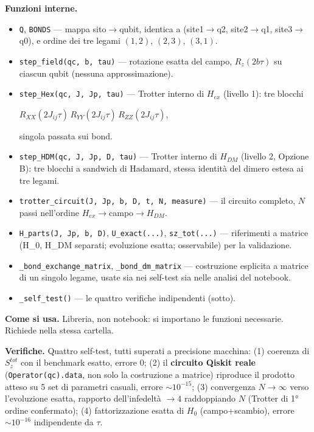 \documentclass[11pt,a4paper]{article}
\begin{document}
\textbf{Funzioni interne.}
\begin{itemize}
\item \texttt{Q}, \texttt{BONDS} — mappa sito$\to$qubit, identica a
\texttt{} (site1$\to$q2, site2$\to$q1,
site3$\to$q0), e ordine dei tre legami $(1,2)$, $(2,3)$, $(3,1)$.
\item \texttt{step\_field(qc,\ b,\ tau)} — rotazione esatta del campo, $R_z(2b\tau)$
su ciascun qubit (nessuna approssimazione).
\item \texttt{step\_Hex(qc,\ J,\ Jp,\ tau)} — Trotter interno di $H_{ex}$ (livello 1):
tre blocchi
\begin{center}
$R_{XX}(2J_{ij}\tau)\,R_{YY}(2J_{ij}\tau)\,R_{ZZ}(2J_{ij}\tau)$,
\end{center}
singola passata sui bond.
\item \texttt{step\_HDM(qc,\ J,\ Jp,\ D,\ tau)} — Trotter interno di $H_{DM}$
(livello 2, Opzione B): tre blocchi a sandwich di Hadamard, stessa identità del
dimero estesa ai tre legami.
\item \texttt{trotter\_circuit(J,\ Jp,\ b,\ D,\ t,\ N,\ measure)} — il circuito
completo, $N$ passi nell'ordine $H_{ex}\to$campo$\to H_{DM}$.
\item \texttt{H\_parts(J,\ Jp,\ b,\ D)}, \texttt{U\_exact(...)}, \texttt{sz\_tot(...)}
— riferimenti a matrice (H\_0, H\_DM separati; evoluzione esatta; osservabile) per la
validazione.
\item \texttt{\_bond\_exchange\_matrix}, \texttt{\_bond\_dm\_matrix} — costruzione
esplicita a matrice di un singolo legame, usate sia nei self-test sia nelle analisi
del notebook.
\item \texttt{\_self\_test()} — le quattro verifiche indipendenti (sotto).
\end{itemize}

\textbf{Come si usa.} Libreria, non notebook: si importano le funzioni necessarie.
Richiede \texttt{} nella stessa cartella.

\textbf{Verifiche.} Quattro self-test, tutti superati a precisione macchina:
(1) coerenza di $S_z^{tot}$ con il benchmark esatto, errore $0$; (2) il
\textbf{circuito Qiskit reale} (\texttt{Operator(qc).data}, non solo la costruzione a
matrice) riproduce il prodotto atteso su 5 set di parametri casuali, errore
$\sim10^{-15}$; (3) convergenza $N\to\infty$ verso l'evoluzione esatta, rapporto
dell'infedeltà $\to4$ raddoppiando $N$ (Trotter di 1° ordine confermato); (4)
fattorizzazione esatta di $H_0$ (campo+scambio), errore $\sim10^{-16}$ indipendente
da $\tau$.
\end{document}
